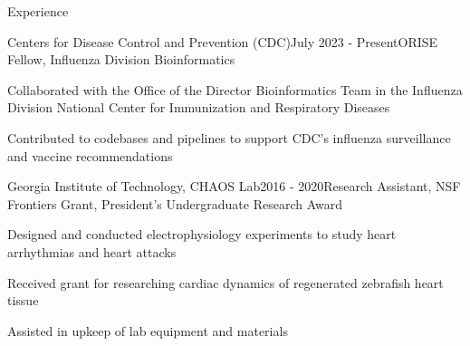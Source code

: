 \documentclass{resume} %
\begin{document}
\begin{rSection}{Experience}

\begin{rSubsection}{Centers for Disease Control and Prevention (CDC)}{July 2023 - Present}{ORISE Fellow, Influenza Division Bioinformatics}{}
\item Collaborated with the Office of the Director Bioinformatics Team in the Influenza Division National Center for Immunization and Respiratory Diseases
\item Contributed to codebases and pipelines to support CDC's influenza surveillance and vaccine recommendations
\end{rSubsection}


\begin{rSubsection}{Georgia Institute of Technology, CHAOS Lab}{2016 - 2020}{Research Assistant, NSF Frontiers Grant, President's Undergraduate Research Award}{}
\item Designed and conducted electrophysiology  experiments to study heart arrhythmias and heart attacks
\item Received grant for researching cardiac dynamics of regenerated zebrafish heart tissue
\item Assisted in upkeep of lab equipment and materials
\end{rSubsection}




\end{rSection}
\end{document}
